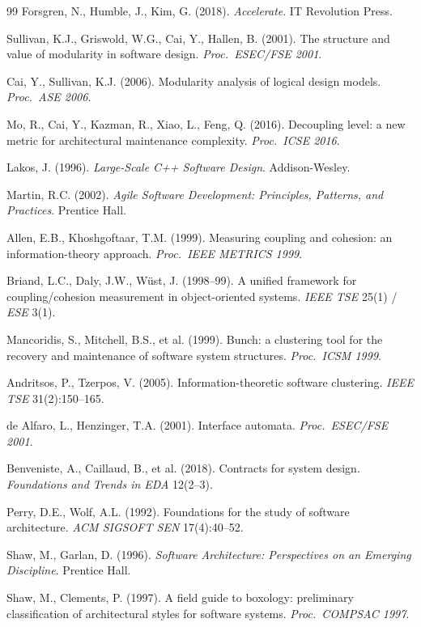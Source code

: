 \documentclass[11pt,oneside]{article}
\theoremstyle{definition}
\begin{document}
\begin{thebibliography}{99}
 Forsgren, N., Humble, J., Kim, G. (2018). \emph{Accelerate}. IT
Revolution Press.

 Sullivan, K.J., Griswold, W.G., Cai, Y., Hallen, B. (2001). The structure
and value of modularity in software design. \emph{Proc.\ ESEC/FSE 2001}.

 Cai, Y., Sullivan, K.J. (2006). Modularity analysis of logical design models.
\emph{Proc.\ ASE 2006}.

 Mo, R., Cai, Y., Kazman, R., Xiao, L., Feng, Q. (2016). Decoupling level: a new
metric for architectural maintenance complexity. \emph{Proc.\ ICSE 2016}.

 Lakos, J. (1996). \emph{Large-Scale C++ Software Design}. Addison-Wesley.

 Martin, R.C. (2002). \emph{Agile Software Development: Principles,
Patterns, and Practices}. Prentice Hall.

 Allen, E.B., Khoshgoftaar, T.M. (1999). Measuring coupling and cohesion: an
information-theory approach. \emph{Proc.\ IEEE METRICS 1999}.

 Briand, L.C., Daly, J.W., Wüst, J. (1998--99). A unified framework for
coupling/cohesion measurement in object-oriented systems. \emph{IEEE TSE} 25(1) / \emph{ESE} 3(1).

 Mancoridis, S., Mitchell, B.S., et al. (1999). Bunch: a clustering tool
for the recovery and maintenance of software system structures. \emph{Proc.\ ICSM 1999}.

 Andritsos, P., Tzerpos, V. (2005). Information-theoretic software
clustering. \emph{IEEE TSE} 31(2):150--165.

 de Alfaro, L., Henzinger, T.A. (2001). Interface automata. \emph{Proc.\
ESEC/FSE 2001}.

 Benveniste, A., Caillaud, B., et al. (2018). Contracts for system
design. \emph{Foundations and Trends in EDA} 12(2--3).

 Perry, D.E., Wolf, A.L. (1992). Foundations for the study of software
architecture. \emph{ACM SIGSOFT SEN} 17(4):40--52.

 Shaw, M., Garlan, D. (1996). \emph{Software Architecture: Perspectives
on an Emerging Discipline}. Prentice Hall.

 Shaw, M., Clements, P. (1997). A field guide to boxology: preliminary
classification of architectural styles for software systems. \emph{Proc.\ COMPSAC 1997}.


\end{thebibliography}
\end{document}
